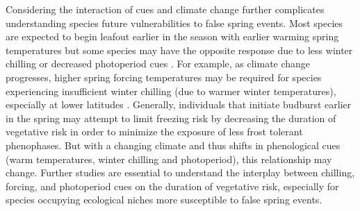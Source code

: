 \documentclass{article}\usepackage[]{graphicx}\usepackage[]{color}
\begin{document}
Considering the interaction of cues and climate change further complicates understanding species future vulnerabilities to false spring events. Most species are expected to begin leafout earlier in the season with earlier warming spring temperatures but some species may have the opposite response due to less winter chilling or decreased photoperiod cues \citep{Cleland2006, Yu2010, Xin2016}. For example, as climate change progresses, higher spring forcing temperatures may be required for species experiencing insufficient winter chilling (due to warmer winter temperatures), especially at lower latitudes \citep{McCreary1990, Morin2009, Fu2012, Polgar2014, Chuine2010}. Generally, individuals that initiate budburst earlier in the spring may attempt to limit freezing risk by decreasing the duration of vegetative risk in order to minimize the exposure of less frost tolerant phenophases. But with a changing climate and thus shifts in phenological cues (warm temperatures, winter chilling and photoperiod), this relationship may change. Further studies are essential to understand the interplay between chilling, forcing, and photoperiod cues on the duration of vegetative risk, especially for species occupying ecological niches more susceptible to false spring events. 




\end{document}
